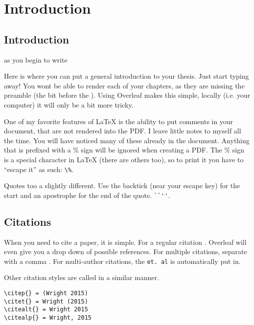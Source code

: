 
\chapter{Introduction} %

\label{Introduction} %

\section{Introduction}

as you begin to write

Here is where you can put a general introduction to your thesis. Just start typing away! You wont be able to render each of your chapters, as they are missing the preamble (the bit before the \verb++). Using Overleaf makes this simple, locally (i.e. your computer) it will only be a bit more tricky. 

One of my favorite features of \LaTeX{} is the ability to put comments in your document, that are not rendered into the PDF. I leave little notes to myself all the time. You will have noticed many of these already in the document. Anything that is prefixed with a \% sign will be ignored when creating a PDF. The \% sign is a special character in \LaTeX{} (there are others too), so to print it you have to ``escape it'' as such: \verb+\%+.

Quotes too a slightly different. Use the backtick (near your escape key) for the start and an apostrophe for the end of the quote. \verb+``''+. 

\section{Citations}
When you need to cite a paper, it is simple. For a regular citation \citep{wright1932roles}. Overleaf will even give you a drop down of possible references. For multiple citations, separate with a comma \citep{wright1932roles,haldane1922sex}. For multi-author citations, the \verb+et. al+ is automatically put in.



Other citation styles are called in a similar manner.
\begin{verbatim}
\citep{} = (Wright 2015)
\citet{} = Wright (2015)
\citealt{} = Wright 2015
\citealp{} = Wright, 2015
\end{verbatim}

